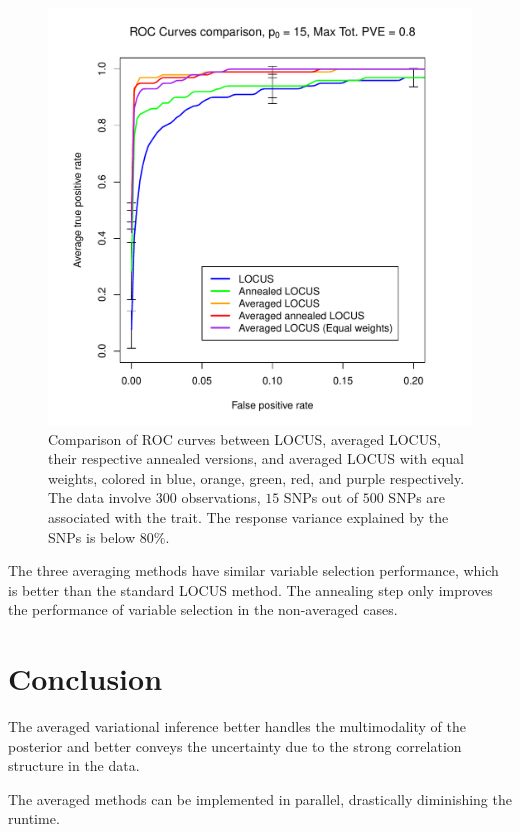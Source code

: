 \documentclass[portrait, a0, 30pt]{sciposter}
\begin{document}
\begin{multicols*}{2}
\begin{figure}[H]
\centering
\includegraphics[width=11in]{images/ROC_curves.pdf}
\caption{\label{fig:ROC}Comparison of ROC curves between LOCUS, averaged LOCUS, their respective annealed versions, and averaged LOCUS with equal weights, colored in blue, orange, green, red, and purple respectively. The data involve $300$ observations, $15$ SNPs out of $500$ SNPs are associated with the trait. The response variance explained by the SNPs is below $80\%$.}
\end{figure}

The three averaging methods have similar variable selection performance, which is better than the standard LOCUS method. The annealing step only improves the performance of variable selection in the non-averaged cases.
\section{Conclusion}
The averaged variational inference better handles the multimodality of the posterior and better conveys the uncertainty due to the strong correlation structure in the data.

The averaged methods can be implemented in parallel, drastically diminishing the runtime.


\end{multicols*}
\end{document}
